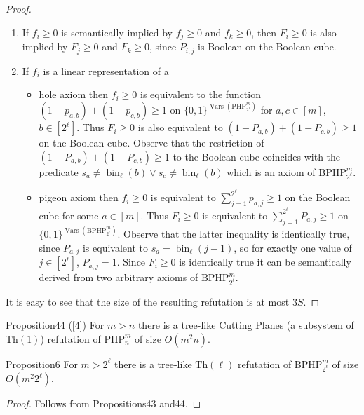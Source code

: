 \begin{proof}
\begin{enumerate}
\item[(a)] If $f_i\ge0$ is semantically implied by $f_j\ge0$ and $f_k\ge0$, then $F_i\ge0$ is also implied by $F_j\ge0$ and $F_k\ge0$, since $P_{i,j}$ is Boolean on the Boolean cube.
\item[(b)] If $f_i$ is a linear representation of a
\begin{itemize}
\item hole axiom then $f_i\ge0$ is equivalent to the function $(1-p_{a,b})+(1-p_{c,b})\ge1$ on $\{0,1\}^{\operatorname{Vars}(\mathrm{PHP}_{2^\ell}^m)}$ for $a,c\in[m]$, $b\in[2^\ell]$. Thus $F_i\ge0$ is also equivalent to $(1-P_{a,b})+(1-P_{c,b})\ge1$ on the Boolean cube. Observe that the restriction of $(1-P_{a,b})+(1-P_{c,b})\ge1$ to the Boolean cube coincides with the predicate $s_a\ne\operatorname{bin}_\ell(b)\vee s_c\ne\operatorname{bin}_\ell(b)$ which is an axiom of $\mathrm{BPHP}_{2^\ell}^m$.
\item pigeon axiom then $f_i\ge0$ is equivalent to $\sum_{j=1}^{2^\ell}p_{a,j}\ge1$ on the Boolean cube for some $a\in[m]$. Thus $F_i\ge0$ is equivalent to $\sum_{j=1}^{2^\ell}P_{a,j}\ge1$ on $\{0,1\}^{\operatorname{Vars}(\mathrm{BPHP}_{2^\ell}^m)}$. Observe that the latter inequality is identically true, since $P_{a,j}$ is equivalent to $s_a=\operatorname{bin}_\ell(j-1)$, so for exactly one value of $j\in[2^\ell]$, $P_{a,j}=1$. Since $F_i\ge0$ is identically true it can be semantically derived from two arbitrary axioms of $\mathrm{BPHP}_{2^\ell}^m$.
\end{itemize}
\end{enumerate}
It is easy to see that the size of the resulting refutation is at most $3S$.
\end{proof}
\begin{authorclaim}{Proposition44 ([4])}
For $m>n$ there is a tree-like Cutting Planes (a subsystem of $\mathrm{Th}(1)$) refutation of $\mathrm{PHP}_n^m$ of size $O(m^2n)$.
\end{authorclaim}
\begin{authorclaim}{Proposition6}
For $m>2^\ell$ there is a tree-like $\mathrm{Th}(\ell)$ refutation of $\mathrm{BPHP}_{2^\ell}^m$ of size $O(m^2 2^\ell)$.
\end{authorclaim}
\begin{proof}
Follows from Propositions43 and44.
\end{proof}
